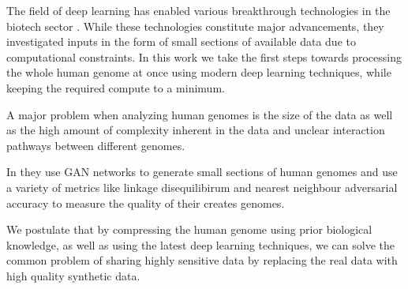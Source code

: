 
The field of deep learning has enabled various breakthrough technologies in the biotech sector \citep{alphafold, wong2024discovery, cheng2023accurate}. While these technologies constitute major advancements, they investigated inputs in the form of small sections of available data due to computational constraints. In this work we take the first steps towards processing the whole human genome at once using modern deep learning techniques, while keeping the required compute to a minimum.

A major problem when analyzing human genomes is the size of the data as well as the high amount of complexity inherent in the data and unclear interaction pathways between different genomes. 

In \citet{yelmen2021creating} they use GAN networks to generate small sections of human genomes and use a variety of metrics like linkage disequilibirum and nearest neighbour adversarial accuracy to measure the quality of their creates genomes.

We postulate that by compressing the human genome using prior biological knowledge, as well as using the latest deep learning techniques,
we can solve the common problem of sharing highly sensitive data by replacing the real data with high quality synthetic data. 